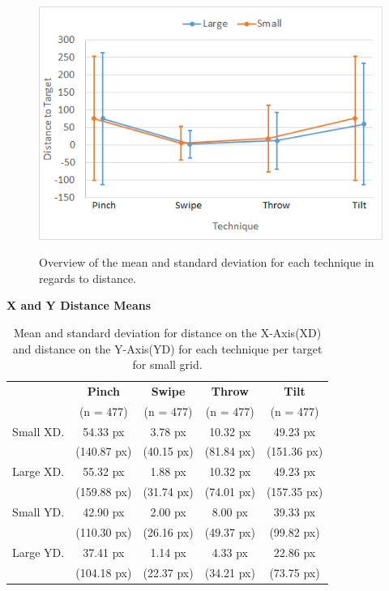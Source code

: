 \begin{figure}[H]
	{\includegraphics[width = 1\columnwidth ]{images/distance.png}} 
	\caption{
		Overview of the mean and standard deviation for each technique in regards to distance.
	}
	\label{fig:distanceResults}
\end{figure}

\begin{table}[H]
	\centering
	\textbf{X and Y Distance Means}\\[4pt]
	\begin{adjustbox}{width=\columnwidth}
	\begin{tabular}{|c|c|c|c|c|}
		\hline
		\rowcolor[HTML]{9B9B9B} 
		& \textbf{Pinch} & \textbf{Swipe} & \textbf{Throw} & \textbf{Tilt} \\
		\rowcolor[HTML]{9B9B9B} 
		& (n = 477) & (n = 477) & (n = 477) & (n = 477) \\ \hline
		Small XD. & 54.33 px & 3.78 px & 10.32 px & 49.23 px \\
		& (140.87 px) & (40.15 px) & (81.84 px) & (151.36 px) \\ \hline
		Large XD. & 55.32 px & 1.88 px & 10.32 px & 49.23 px \\
		& (159.88 px) & (31.74 px) & (74.01 px) & (157.35 px) \\ \hline
		Small YD. & 42.90 px & 2.00 px & 8.00 px & 39.33 px \\
		& (110.30 px) & (26.16 px) & (49.37 px) & (99.82 px) \\ \hline
		Large YD. & 37.41 px & 1.14 px & 4.33 px & 22.86 px \\
		& (104.18 px) & (22.37 px) & (34.21 px) & (73.75 px) \\ \hline
	\end{tabular}
	\end{adjustbox}
	\caption{Mean and standard deviation for distance on the X-Axis(XD) and distance on the Y-Axis(YD) for each technique per target for small grid.}
	\label{tab:distanceXY}
\end{table}

